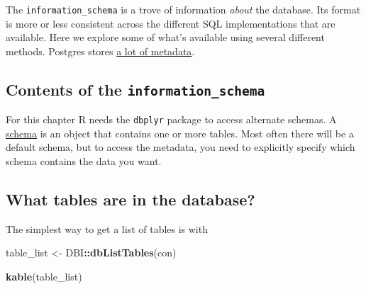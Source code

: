 \documentclass[]{book}
\newenvironment{Shaded}{\begin{snugshade}}{\end{snugshade}}
\newcommand{\KeywordTok}[1]{\textcolor[rgb]{0.13,0.29,0.53}{\textbf{#1}}}
\newcommand{\NormalTok}[1]{#1}
\newcommand{\OperatorTok}[1]{\textcolor[rgb]{0.81,0.36,0.00}{\textbf{#1}}}
\newcommand{\StringTok}[1]{\textcolor[rgb]{0.31,0.60,0.02}{#1}}
\theoremstyle{definition}
\theoremstyle{definition}
\theoremstyle{definition}
\theoremstyle{remark}
\begin{document}
The \texttt{information\_schema} is a trove of information \emph{about}
the database. Its format is more or less consistent across the different
SQL implementations that are available. Here we explore some of what's
available using several different methods. Postgres stores
\href{https://www.postgresql.org/docs/current/static/infoschema-columns.html}{a
lot of metadata}.

\hypertarget{contents-of-the-information_schema}{%
\subsection{\texorpdfstring{Contents of the
\texttt{information\_schema}}{Contents of the information\_schema}}\label{contents-of-the-information_schema}}

For this chapter R needs the \texttt{dbplyr} package to access alternate
schemas. A
\href{http://www.postgresqltutorial.com/postgresql-server-and-database-objects/}{schema}
is an object that contains one or more tables. Most often there will be
a default schema, but to access the metadata, you need to explicitly
specify which schema contains the data you want.

\hypertarget{what-tables-are-in-the-database}{%
\subsection{What tables are in the
database?}\label{what-tables-are-in-the-database}}

The simplest way to get a list of tables is with

\begin{Shaded}
\begin{Highlighting}[]
\NormalTok{table_list  <-}\StringTok{ }\NormalTok{DBI}\OperatorTok{::}\KeywordTok{dbListTables}\NormalTok{(con)}

\KeywordTok{kable}\NormalTok{(table_list)}
\end{Highlighting}
\end{Shaded}
\end{document}
